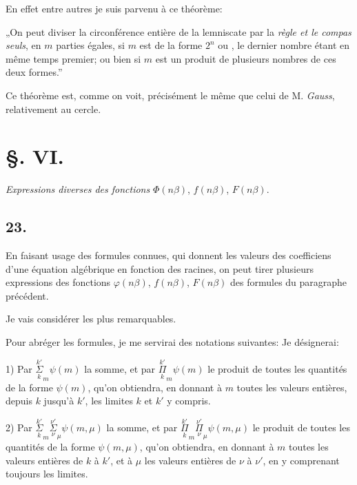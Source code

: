 \documentclass{article}
\begin{document}

En effet entre autres je suis parvenu à ce théorème:

„On peut diviser la circonférence entière de la lemniscate par la \emph{règle et le compas seuls}, en $m$ parties égales, si $m$ est de la forme $2^{n}$ ou , le dernier nombre étant en même temps premier; ou bien si $m$ est un produit de plusieurs nombres de ces deux formes.”

Ce théorème est, comme on voit, précisément le même que celui de M. \emph{Gauss}, relativement au cercle.

\section*{§. VI.}

\emph{Expressions diverses des fonctions} $\Phi(n\beta)$, $f(n\beta)$, $F(n\beta)$.

\subsection*{23.}

En faisant usage des formules connues, qui donnent les valeurs des coefficiens d'une équation algébrique en fonction des racines, on peut tirer plusieurs expressions des fonctions $\varphi(n\beta)$, $f(n\beta)$, $F(n\beta)$ des formules du paragraphe précédent.

Je vais considérer les plus remarquables.

Pour abréger les formules, je me servirai des notations suivantes: Je désignerai:

1) Par $\overset{k'}{\underset{k}{\Sigma}}_{m}\psi(m)$ la somme, et par $\overset{k'}{\underset{k}{\Pi}}_{m}\psi(m)$ le produit de toutes les quantités de la forme $\psi(m)$, qu'on obtiendra, en donnant à $m$ toutes les valeurs entières, depuis $k$ jusqu'à $k'$, les limites $k$ et $k'$ y compris.

2) Par $\overset{k'}{\underset{k}{\Sigma}}_{m}\overset{\nu'}{\underset{\nu}{\Sigma}}_{\mu}\psi(m,\mu)$ la somme, et par $\overset{k'}{\underset{k}{\Pi}}_{m}\overset{\nu'}{\underset{\nu}{\Pi}}_{\mu}\psi(m,\mu)$ le produit de toutes les quantités de la forme $\psi(m,\mu)$, qu'on obtiendra, en donnant à $m$ toutes les valeurs entières de $k$ à $k'$, et à $\mu$ les valeurs entières de $\nu$ à $\nu'$, en y comprenant toujours les limites.
\end{document}
